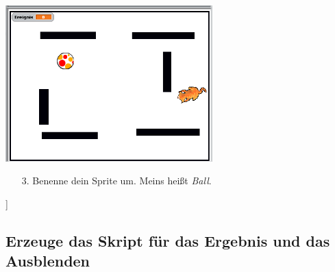 \includegraphics[width=0.6\textwidth]{images/aufgabe3_schrumpfen2.png}
\begin{itemize}
\item[3.] Benenne dein Sprite um. Meins heißt \textit{Ball}.
\end{itemize}]

\subsection{Erzeuge das Skript für das Ergebnis und das Ausblenden}

